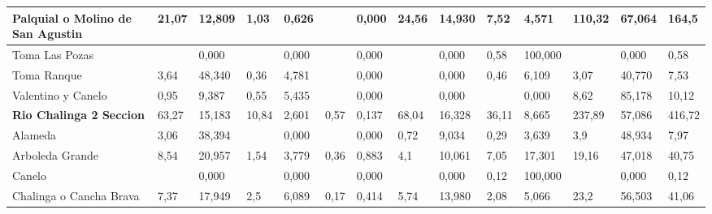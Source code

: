 \documentclass[]{article}
\begin{document}
\begin{landscape}
\begin{longtable}{|p{2.5cm}|p{1.5cm}|p{1cm}|p{1cm}|p{1cm}|p{1cm}|p{1cm}|p{1.7cm}|p{1cm}|p{1.5cm}|p{1cm}|p{1cm}|p{1cm}|p{1.5cm}|}
	Palquial o Molino de San Agustin & 21,07           & 12,809      & 1,03                 & 0,626       &                        & 0,000       & 24,56                & 14,930      & 7,52             & 4,571       & 110,32               & 67,064      & 164,5                  \\ \hline
	Toma Las Pozas                   &                 & 0,000       &                      & 0,000       &                        & 0,000       &                      & 0,000       & 0,58             & 100,000     &                      & 0,000       & 0,58                   \\ \hline
	Toma Ranque                      & 3,64            & 48,340      & 0,36                 & 4,781       &                        & 0,000       &                      & 0,000       & 0,46             & 6,109       & 3,07                 & 40,770      & 7,53                   \\ \hline
	Valentino y Canelo               & 0,95            & 9,387       & 0,55                 & 5,435       &                        & 0,000       &                      & 0,000       &                  & 0,000       & 8,62                 & 85,178      & 10,12                  \\ \pagebreak
	\textbf{Rio Chalinga 2 Seccion}  & 63,27           & 15,183      & 10,84                & 2,601       & 0,57                   & 0,137       & 68,04                & 16,328      & 36,11            & 8,665       & 237,89               & 57,086      & 416,72                 \\ \hline
	Alameda                          & 3,06            & 38,394      &                      & 0,000       &                        & 0,000       & 0,72                 & 9,034       & 0,29             & 3,639       & 3,9                  & 48,934      & 7,97                   \\ \hline
	Arboleda Grande                  & 8,54            & 20,957      & 1,54                 & 3,779       & 0,36                   & 0,883       & 4,1                  & 10,061      & 7,05             & 17,301      & 19,16                & 47,018      & 40,75                  \\ \hline
	Canelo                           &                 & 0,000       &                      & 0,000       &                        & 0,000       &                      & 0,000       & 0,12             & 100,000     &                      & 0,000       & 0,12                   \\ \hline
	Chalinga o Cancha Brava          & 7,37            & 17,949      & 2,5                  & 6,089       & 0,17                   & 0,414       & 5,74                 & 13,980      & 2,08             & 5,066       & 23,2                 & 56,503      & 41,06                  \\ \hline

\end{longtable}
\end{landscape}
\end{document}
